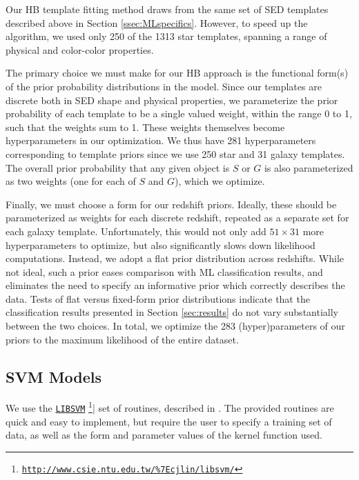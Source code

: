\documentclass[12pt,preprint]{aastex}
\begin{document}

Our HB template fitting method draws from the same set of SED
templates described above in Section \ref{ssec:MLspecifics}.  However,
to speed up the algorithm, we used only 250 of the 1313 star
templates, spanning a range of physical and color-color properties.

The primary choice we must make for our HB approach is the functional
form(s) of the prior probability distributions in the model.  Since
our templates are discrete both in SED shape and physical properties,
we parameterize the prior probability of each template to be a single
valued weight, within the range 0 to 1, such that the weights sum to
1.  These weights themselves become hyperparameters in our
optimization.  We thus have 281 hyperparameters corresponding to
template priors since we use 250 star and 31 galaxy templates.  The
overall prior probability that any given object is $S$ or $G$ is also
parameterized as two weights (one for each of $S$ and $G$), which we
optimize.

Finally, we must choose a form for our redshift priors.  Ideally,
these should be parameterized as weights for each discrete redshift,
repeated as a separate set for each galaxy template.  Unfortunately,
this would not only add $51\times31$ more hyperparameters to optimize,
but also significantly slows down likelihood computations.  Instead,
we adopt a flat prior distribution across redshifts.  While not ideal,
such a prior eases comparison with ML classification results, and
eliminates the need to specify an informative prior which correctly
describes the data.  Tests of flat versus fixed-form prior
distributions indicate that the classification results presented in
Section \ref{sec:results} do not vary substantially between the two
choices.  In total, we optimize the 283 (hyper)parameters of our
priors to the maximum likelihood of the entire dataset.

\subsection{SVM Models}

We use the \href{http://www.csie.ntu.edu.tw/\%7Ecjlin/libsvm/}{\texttt{LIBSVM}}
\footnote{\href{http://www.csie.ntu.edu.tw/\%7Ecjlin/libsvm/}
{\tt http://www.csie.ntu.edu.tw/\%7Ecjlin/libsvm/}}| set of routines,
described in \citet{chang11a}.  The provided routines are quick and
easy to implement, but require the user to specify a training set of
data, as well as the form and parameter values of the kernel function
used.
\end{document}
